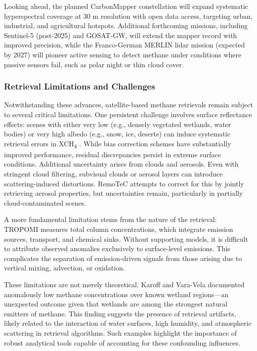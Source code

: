 Looking ahead, the planned CarbonMapper constellation will expand systematic hyperspectral coverage at 30 m resolution with open data access, targeting urban, industrial, and agricultural hotspots. Additional forthcoming missions, including Sentinel-5 (post-2025) and GOSAT-GW, will extend the mapper record with improved precision, while the Franco-German MERLIN lidar mission (expected by 2027) will pioneer active sensing to detect methane under conditions where passive sensors fail, such as polar night or thin cloud cover.

\subsubsection{Retrieval Limitations and Challenges}

Notwithstanding these advances, satellite-based methane retrievals remain subject to several critical limitations. One persistent challenge involves surface reflectance effects: scenes with either very low (e.g., densely vegetated wetlands, water bodies) or very high albedo (e.g., snow, ice, deserts) can induce systematic retrieval errors in XCH\textsubscript{4} \cite{Lorente2021}. While bias correction schemes have substantially improved performance, residual discrepancies persist in extreme surface conditions. Additional uncertainty arises from clouds and aerosols. Even with stringent cloud filtering, subvisual clouds or aerosol layers can introduce scattering-induced distortions. RemoTeC attempts to correct for this by jointly retrieving aerosol properties, but uncertainties remain, particularly in partially cloud-contaminated scenes.

A more fundamental limitation stems from the nature of the retrieval: TROPOMI measures total column concentrations, which integrate emission sources, transport, and chemical sinks. Without supporting models, it is difficult to attribute observed anomalies exclusively to surface-level emissions. This complicates the separation of emission-driven signals from those arising due to vertical mixing, advection, or oxidation.

These limitations are not merely theoretical. Karoff and Vara-Vela \cite{Karoff2023} documented anomalously low methane concentrations over known wetland regions---an unexpected outcome given that wetlands are among the strongest natural emitters of methane. This finding suggests the presence of retrieval artifacts, likely related to the interaction of water surfaces, high humidity, and atmospheric scattering in retrieval algorithms. Such examples highlight the importance of robust analytical tools capable of accounting for these confounding influences.


